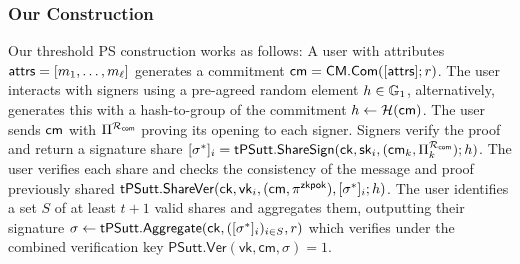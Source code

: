 \subsubsection{Our Construction}\label{threshold-ps-construction}


Our threshold PS construction works as follows:
A user with attributes $\mathsf{attrs} = [m_1, \ldots, m_\ell]$ generates a commitment $\mathsf{cm} = \mathsf{CM.Com}([\mathsf{attrs}];r)$. The user interacts with signers using a pre-agreed random element $h \in \mathbb{G}_1$, alternatively, \cite{sonnino_coconut_2020} generates this with a hash-to-group of the commitment $h \gets \mathcal{H}(\mathsf{cm})$. The user sends $\mathsf{cm}$ with $\Pi^{\mathcal{R}_{\mathsf{com}}}$ proving its opening to each signer. Signers verify the proof and return a signature share $[\sigma^*]_i = \mathsf{tPSutt.ShareSign}(\mathsf{ck}, \mathsf{sk}_i, (\mathsf{cm}_k, \Pi^{\mathcal{R}_{\mathsf{com}}}_k); h)$. The user verifies each share and checks the consistency of the message and proof previously shared $\mathsf{tPSutt.ShareVer}(\mathsf{ck}, \mathsf{vk}_i, (\mathsf{cm}, \pi^{\mathsf{zkpok}}), [\sigma^*]_i; h)$. The user identifies a set $S$ of at least $t+1$ valid shares and aggregates them, outputting their signature $\sigma \leftarrow \mathsf{tPSutt.Aggregate}(\mathsf{ck}, ([\sigma^*]_i)_{i \in S}, r)$ which verifies under the combined  verification key $\mathsf{PSutt.Ver}(\mathsf{vk}, \mathsf{cm}, \sigma) = 1$.


